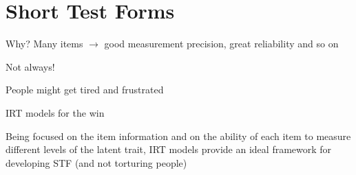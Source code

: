 \documentclass[aspectratio=149, compress]{beamer}
\begin{document}
\section[STF]{Short Test Forms}

\begin{frame}{Why?}
	Many items $\rightarrow$ good measurement precision, great reliability and so on
	
	\begin{center}
		Not always!
	\end{center}
	
	
	People might get tired and frustrated 
	 
	
	\begin{block}{IRT models for the win}
		
	Being focused on the item information and on the ability of each item to measure different levels of the latent trait, IRT models provide an ideal framework for developing STF (and not torturing people)	
	\end{block}
	
\end{frame}
\end{document}
